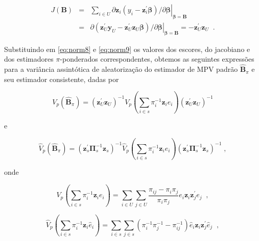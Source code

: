 \documentclass[]{book}
\numberwithin{example}{chapter}
\numberwithin{remark}{chapter}
\numberwithin{definition}{chapter}
\begin{document}
\begin{eqnarray}
J\left( \mathbf{B}\right) &=&\left. \sum\nolimits_{i\in U}\partial \mathbf{z}
_{i}\left( y_{i}-\mathbf{z}_{i}^{\prime }\mathbf{\beta }\right) /\partial 
\mathbf{\beta }\right| _{\mathbf{\beta }=\mathbf{B}}  \label{eq:norm20} \\
&=&\left. \partial \left( \mathbf{z}_{U}^{\prime }\mathbf{y}_{U}-\mathbf{z}
_{U}^{\prime }\mathbf{z}_{U}\mathbf{\beta }\right) /\partial \mathbf{\beta }
\right| _{\mathbf{\beta }=\mathbf{B}}=-\mathbf{z}_{U}^{\prime }\mathbf{z}
_{U}\;\;.  \nonumber
\end{eqnarray}

Substituindo em \eqref{eq:norm8} e \eqref{eq:norm9} os valores dos escores,
do jacobiano e dos estimadores \(\pi\)-ponderados correspondentes,
obtemos as seguintes expressões para a variância assintótica de
aleatorização do estimador de MPV padrão \(\widehat{\mathbf{B}}_{\pi}\)
e seu estimador consistente, dadas por

\begin{equation}
V_{p}\left( \widehat{\mathbf{B}}_{\pi }\right) =\left( \mathbf{z}
_{U}^{\prime }\mathbf{z}_{U}\right) ^{-1}V_{p}\left( \sum\limits_{i\in s}\pi
_{i}^{-1}\mathbf{z}_{i}e_{i}\right) \left( \mathbf{z}_{U}^{\prime }\mathbf{z}
_{U}\right) ^{-1}  \label{eq:norm21}
\end{equation}

e

\begin{equation}
\hat{V}_{p}\left( \widehat{\mathbf{B}}_{\pi }\right) =\left( \mathbf{z}
_{s}^{\prime }\mathbf{\Pi }_{s}^{-1}\mathbf{z}_{s}\right) ^{-1}\hat{V}
_{p}\left( \sum\limits_{i\in s}\pi _{i}^{-1}\mathbf{z}_{i}e_{i}\right)
\left( \mathbf{z}_{s}^{\prime }\mathbf{\Pi }_{s}^{-1}\mathbf{z}_{s}\right)
^{-1}\;,  \label{eq:norm22}
\end{equation}

onde

\begin{equation}
V_{p}\left( \sum\limits_{i\in s}\pi _{i}^{-1}\mathbf{z}_{i}e_{i}\right)
=\sum\limits_{i\in U}\sum\limits_{j\in U}\frac{\pi _{ij}-\pi _{i}\pi _{j}}{
\pi _{i}\pi _{j}}e_{i}\mathbf{z}_{i}\mathbf{z}_{j}^{\prime }e_{j}\;\;,
\label{eq:norm23}
\end{equation}

\begin{equation}
\hat{V}_{p}\left( \sum\limits_{i\in s}\pi _{i}^{-1}\mathbf{z}_{i}\hat{e}
_{i}\right) =\sum\limits_{i\in s}\sum\limits_{j\in s}\left( \pi _{i}^{-1}\pi
_{j}^{-1}-\pi _{ij}^{-1}\right) \hat{e}_{i}\mathbf{z}_{i}\mathbf{z}
_{j}^{\prime }\hat{e}_{j}\;\;,  \label{eq:norm24}
\end{equation}
\end{document}
